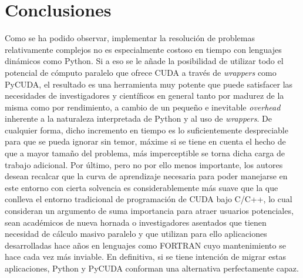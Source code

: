 \documentclass[twocolumn,twoside]{Jornadas}
\begin{document}
\balance
\section{Conclusiones}

Como se ha podido observar, implementar la resoluci\'{o}n de problemas relativamente complejos no es especialmente costoso en tiempo con lenguajes din\'{a}micos como Python. Si a eso se le a\~{n}ade la posibilidad de utilizar todo el potencial de c\'{o}mputo paralelo que ofrece CUDA a trav\'{e}s de \emph{wrappers} como PyCUDA, el resultado es una herramienta muy potente que puede satisfacer las necesidades de investigadores y cient\'{i}ficos en general tanto por madurez de la misma como por rendimiento, a cambio de un peque\~{n}o e inevitable \emph{overhead} inherente a la naturaleza interpretada de Python y al uso de \emph{wrappers}. De cualquier forma, dicho incremento en tiempo es lo suficientemente despreciable para que se pueda ignorar sin temor, m\'{a}xime si se tiene en cuenta el hecho de que a mayor tama\~{n}o del problema, m\'{a}s imperceptible se torna dicha carga de trabajo adicional. Por \'{u}ltimo, pero no por ello menos importante, los autores desean recalcar que la curva de aprendizaje necesaria para poder manejarse en este entorno con cierta solvencia es considerablemente m\'{a}s suave que la que conlleva el entorno tradicional de programaci\'{o}n de CUDA bajo C/C++, lo cual consideran un argumento de suma importancia para atraer usuarios potenciales, sean acad\'{e}micos de nueva hornada o investigadores asentados que tienen necesidad de c\'{a}lculo masivo paralelo y que utilizan para ello aplicaciones desarrolladas hace a\~{n}os en lenguajes como FORTRAN cuyo mantenimiento se hace cada vez m\'{a}s inviable. En definitiva, si se tiene intenci\'{o}n de migrar estas aplicaciones, Python y PyCUDA conforman una alternativa perfectamente capaz.



\end{document}
